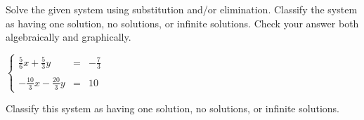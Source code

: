 \documentclass{ximera}
\author{Elizabeth Miller}
\begin{document}
\licenseSZ

Solve the given system using substitution and/or elimination. Classify the system as having one solution, no solutions, or infinite solutions. Check your answer both algebraically and graphically.

$\left\{ \begin{array}{rcr} \frac{5}{6}x+\frac{5}{3}y & = & -\frac{7}{3}  \\ \\ [5pt] -\frac{10}{3}x-\frac{20}{3}y & = & 10  \end{array} \right.$

\begin{exercise}
Classify this system as having one solution, no solutions, or infinite solutions.
\begin{multipleChoice}  
\end{multipleChoice}  
\end{exercise}
\end{document}
